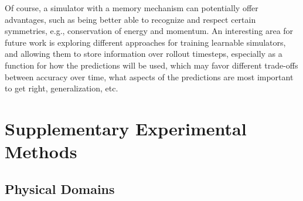 \documentclass{article}
\begin{document}
Of course, a simulator with a memory mechanism can potentially offer advantages,  such as being better able to recognize and respect certain symmetries, e.g., conservation of energy and momentum. An interesting area for future work is exploring different approaches for training learnable simulators, and allowing them to store information over rollout timesteps, especially as a function for how the predictions will be used, which may favor different trade-offs between accuracy over time, what aspects of the predictions are most important to get right, generalization, etc.


\section{Supplementary Experimental Methods}
\label{supp:sec:experiments}


\subsection{Physical Domains}
%
\end{document}
